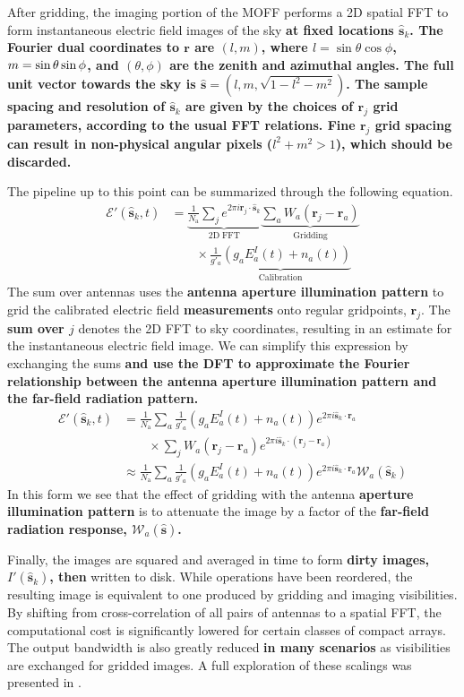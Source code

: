 \documentclass[a4paper,fleqn,usenatbib]{../mnras}
\newcommand{\Nant}{\ensuremath{N_{\mathrm{a}}}}
\newcommand{\s}{\ensuremath{\hat{\mathbf{s}}}} %
\newcommand{\ra}{\ensuremath{\mathbf{r}_a}}
\begin{document}
After gridding, the imaging portion of the MOFF performs a 2D spatial FFT to form 
instantaneous electric field images of the sky \textbf{at fixed locations $\s_k$.
The Fourier dual coordinates to $\mathbf{r}$ are $(l,m)$, where $l=\sin\theta\cos\phi$,
$m=\nobreak\sin\theta\sin\phi$, and $(\theta,\phi)$ are the zenith 
and azimuthal angles. The full unit vector towards the sky is 
$\s=(l,m,\sqrt{1-l^2-m^2})$.
The sample spacing and resolution of $\s_k$ are given 
by the choices of $\mathbf{r}_j$ grid parameters, according to the usual FFT relations. 
Fine $\mathbf{r}_j$ grid spacing can result in non-physical angular pixels ($l^2+m^2>1$),
which should be discarded.}

The pipeline up to this point can be summarized 
through the following equation.
\begin{align}
\mathcal{E}'(\s_k,t) & = \underbrace{\frac{1}{\Nant} \sum_j e^{2\pi i \mathbf{r}_j \cdot \s_k}}_{\mathrm{2D\;FFT}} 
\underbrace{\sum_a W_a(\mathbf{r}_j - \ra)}_{\mathrm{Gridding}} \\
& \qquad \times \underbrace{ \frac{1}{g'_a} \left(g_a E_a^I(t)+n_a(t)\right)}_{\mathrm{Calibration}} \nonumber
\end{align}
The sum over antennas uses the \textbf{antenna aperture illumination pattern} to grid the calibrated electric field \textbf{measurements} onto 
regular gridpoints, $\mathbf{r}_j$. The \textbf{sum over $j$} denotes the 2D FFT to sky coordinates, resulting in an 
estimate for the instantaneous electric field image. We can simplify this expression by 
exchanging the sums \textbf{and use the DFT to approximate the Fourier relationship between
the antenna aperture illumination pattern and the far-field radiation pattern.}
\begin{align}\label{eq:epix}
\mathcal{E}'(\s_k,t) & = \frac{1}{\Nant} \sum_a \frac{1}{g'_a}\left(g_a E^I_a(t)+n_a(t)\right) e^{2\pi i \s_k \cdot \ra} \nonumber \\
  & \qquad\times \sum_j W_a(\mathbf{r}_j-\ra)e^{2\pi i \s_k \cdot (\mathbf{r}_j-\ra)} \nonumber\\
& \approx \frac{1}{\Nant} \sum_a \frac{1}{g'_a}\left(g_aE^I_a(t)+n_a(t)\right) e^{2\pi i \s_k \cdot \ra}\mathcal{W}_a(\s_k)
\end{align}
In this form we see that the effect of gridding with the antenna \textbf{aperture illumination pattern} is to attenuate 
the image by a factor of the \textbf{far-field radiation response, $\mathcal{W}_a(\s)$.}

Finally, the images are squared and averaged in time to form \textbf{dirty images, 
$I'(\hat{\mathbf{s}}_k)$, then} written 
to disk. While operations have been reordered, the resulting image is equivalent to one 
produced by gridding and imaging visibilities. By shifting from cross-correlation of all pairs of 
antennas to a spatial FFT, the computational cost is significantly lowered for certain classes of 
compact arrays. The output bandwidth is also greatly reduced \textbf{in many scenarios} as visibilities are exchanged for 
gridded images. A full exploration of these scalings was presented in \citealt{thy15c}.
\end{document}
